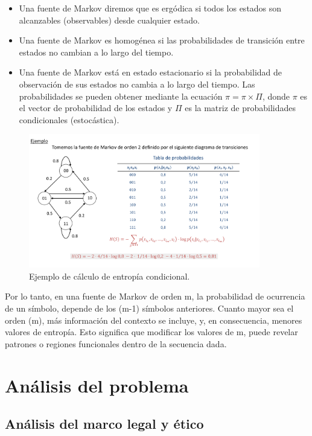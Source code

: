 \documentclass[11pt,spanish,listoffigures,listoftables]{tfgetsinf}
\begin{document}
\begin{itemize}
   \item Una fuente de Markov diremos que es ergódica si todos los estados son alcanzables (observables) desde cualquier estado.
   \item Una fuente de Markov es homogénea si las probabilidades de transición entre estados no cambian a lo largo del tiempo.
   \item Una fuente de Markov está en estado estacionario si la probabilidad de observación de sus estados no cambia a lo largo del tiempo. Las probabilidades se pueden obtener mediante la ecuación $\pi = \pi \times \Pi$, donde $\pi$ es el vector de probabilidad de los estados y $\Pi$ es la matriz de probabilidades condicionales (estocástica).
\end{itemize}

\begin{figure}[H]
   \centering
   \includegraphics[width=0.9\textwidth]{entropia_markov.png}
   \caption{Ejemplo de cálculo de entropía condicional.}
   \label{fig:etiqueta_opcional}
\end{figure}

Por lo tanto, en una fuente de Markov de orden m, la probabilidad de ocurrencia de un símbolo, depende de los (m-1) símbolos anteriores. Cuanto mayor sea el orden (m), más información del contexto se incluye, y, en consecuencia, menores valores de entropía. Esto significa que modificar los valores de m, puede revelar patrones o regiones funcionales dentro de la secuencia dada. 


\chapter{Análisis del problema}

\section{Análisis del marco legal y ético}
\end{document}
